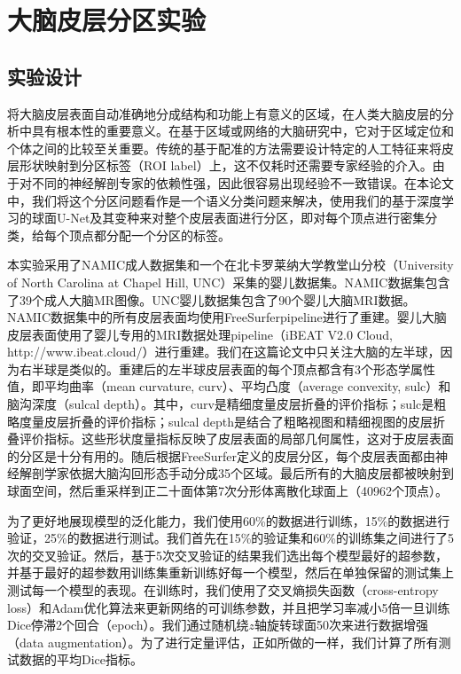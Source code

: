 

\section{大脑皮层分区实验}\label{sec:大脑皮层分区实验}
\subsection{实验设计}\label{sec:大脑皮层分区实验实验设计}
将大脑皮层表面自动准确地分成结构和功能上有意义的区域，在人类大脑皮层的分析中具有根本性的重要意义\cite{meng2015automatic}。在基于区域或网络的大脑研究中，它对于区域定位和个体之间的比较至关重要。传统的基于配准的方法\cite{meng2015automatic,yeo2009spherical,fischl2004automatically}需要设计特定的人工特征来将皮层形状映射到分区标签（ROI label）上，这不仅耗时还需要专家经验的介入。由于对不同的神经解剖专家的依赖性强，因此很容易出现经验不一致错误。在本论文中，我们将这个分区问题看作是一个语义分类问题来解决，使用我们的基于深度学习的球面U-Net及其变种来对整个皮层表面进行分区，即对每个顶点进行密集分类，给每个顶点都分配一个分区的标签。

本实验采用了NAMIC成人数据集\cite{meng2015automatic}和一个在北卡罗莱纳大学教堂山分校（University of North Carolina at Chapel Hill, UNC）采集的婴儿数据集。NAMIC数据集包含了39个成人大脑MR图像。UNC婴儿数据集包含了90个婴儿大脑MRI数据。NAMIC数据集中的所有皮层表面均使用FreeSurfer\cite{fischl2012freesurfer}pipeline进行了重建。婴儿大脑皮层表面使用了婴儿专用的MRI数据处理pipeline\cite{li2015construction,2014measuring}（iBEAT V2.0 Cloud, http://www.ibeat.cloud/）进行重建。我们在这篇论文中只关注大脑的左半球，因为右半球是类似的。重建后的左半球皮层表面的每个顶点都含有3个形态学属性值，即平均曲率（mean curvature, curv）、平均凸度（average convexity, sulc）和脑沟深度（sulcal depth）。其中，curv是精细度量皮层折叠的评价指标；sulc是粗略度量皮层折叠的评价指标；sulcal depth是结合了粗略视图和精细视图的皮层折叠评价指标。这些形状度量指标反映了皮层表面的局部几何属性，这对于皮层表面的分区是十分有用的\cite{desikan2006automated}。随后根据FreeSurfer定义的皮层分区\cite{desikan2006automated}，每个皮层表面都由神经解剖学家依据大脑沟回形态手动分成35个区域。最后所有的大脑皮层都被映射到球面空间，然后重采样到正二十面体第7次分形体离散化球面上（40962个顶点）。

为了更好地展现模型的泛化能力，我们使用60\%的数据进行训练，15\%的数据进行验证，25\%的数据进行测试。我们首先在15\%的验证集和60\%的训练集之间进行了5次的交叉验证。然后，基于5次交叉验证的结果我们选出每个模型最好的超参数，并基于最好的超参数用训练集重新训练好每一个模型，然后在单独保留的测试集上测试每一个模型的表现。在训练时，我们使用了交叉熵损失函数（cross-entropy loss）和Adam优化算法\cite{kingma2014adam}来更新网络的可训练参数，并且把学习率减小5倍一旦训练Dice停滞2个回合（epoch）。我们通过随机绕$z$轴旋转球面50次来进行数据增强（data augmentation）。为了进行定量评估，正如\cite{yeo2009spherical}所做的一样，我们计算了所有测试数据的平均Dice\cite{dice1945measures}指标。

